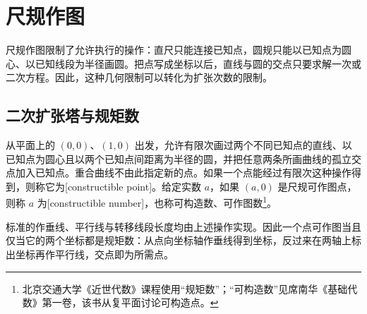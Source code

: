 
\section{尺规作图}
\label{b1:sec:2104}

尺规作图限制了允许执行的操作：直尺只能连接已知点，圆规只能以已知点为圆心、以已知线段为半径画圆。把点写成坐标以后，直线与圆的交点只要求解一次或二次方程。因此，这种几何限制可以转化为扩张次数的限制。

%
%

\subsection{二次扩张塔与规矩数}
\label{b1:subsec:2104:01}

\begin{definition}\label{b1:def:constructible-number}
	从平面上的 \((0,0)\)、\((1,0)\) 出发，允许有限次画过两个不同已知点的直线、以已知点为圆心且以两个已知点间距离为半径的圆，并把任意两条所画曲线的孤立交点加入已知点。重合曲线不由此指定新的点。如果一个点能经过有限次这种操作得到，则称它为[constructible point]。给定实数 \(a\)，如果 \((a,0)\) 是尺规可作图点，则称 \(a\) 为[constructible number]，也称可构造数、可作图数\footnote{北京交通大学《近世代数》课程使用“规矩数”\cite[第 23 章第 1 节“几何作图简史、规矩数”]{BJTU2026ModernAlgebraCourse}；“可构造数”见席南华《基础代数》第一卷\cite[p. 125]{Xi2016BasicAlgebraI}，该书从复平面讨论可构造点。}。
\end{definition}

标准的作垂线、平行线与转移线段长度均由上述操作实现。因此一个点可作图当且仅当它的两个坐标都是规矩数：从点向坐标轴作垂线得到坐标，反过来在两轴上标出坐标再作平行线，交点即为所需点。

